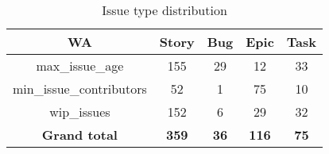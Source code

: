 \begin{table}[h]
\begin{center}
\begin{tabular}{|c|c|c|c|c|} 
\hline

WA & Story & Bug & Epic & Task \\ [0.5ex] 
\hline\hline

max\_issue\_age & 155 & 29 & 12 & 33 \\
min\_issue\_contributors & 52 & 1 & 75 & 10 \\
wip\_issues & 152 & 6 & 29 & 32 \\
\textbf{Grand total} & \textbf{359} & \textbf{36} & \textbf{116} & \textbf{75} \\
\hline
\end{tabular}
\caption{Issue type distribution}
\label{tab:issueConfig}
\end{center}
\end{table}